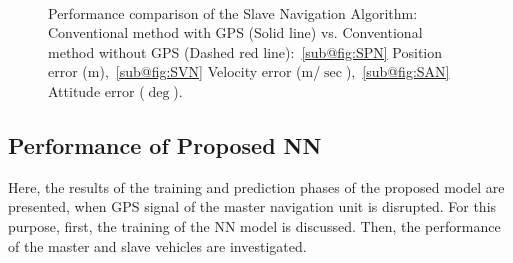 \documentclass[3p]{elsarticle}
\begin{document}
\begin{figure}[H]
{	}\\
	\caption{%
Performance comparison of the Slave Navigation Algorithm: Conventional method with GPS (Solid line) vs. Conventional method without GPS (Dashed red line):~\ref{sub@fig:SPN} Position error (m),~\ref{sub@fig:SVN} Velocity error (m/\(\sec\)),~\ref{sub@fig:SAN} Attitude error (\(\deg\)).
}
	\label{fig:slave}
\end{figure}















\subsection{Performance of Proposed NN}\label{subsec:NN_used}
\noindent Here, the results of the training and prediction phases of the proposed model are presented, when GPS signal of the master navigation unit is disrupted. For this purpose, first, the training of the NN model is discussed. Then, the performance of the master and slave vehicles are investigated.
\end{document}
